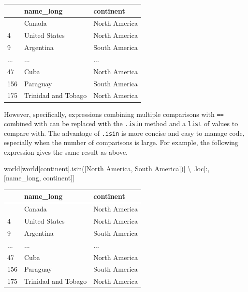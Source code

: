 \documentclass[
  letterpaper,
]{krantz}
\newenvironment{Shaded}{\begin{snugshade}}{\end{snugshade}}
\newcommand{\NormalTok}[1]{\textcolor[rgb]{0.00,0.23,0.31}{#1}}
\newcommand{\OperatorTok}[1]{\textcolor[rgb]{0.37,0.37,0.37}{#1}}
\newcommand{\StringTok}[1]{\textcolor[rgb]{0.13,0.47,0.30}{#1}}
\begin{document}
\begin{longtable}[]{@{}lll@{}}
\toprule\noalign{}
& name\_long & continent \\
\midrule\noalign{}
\endhead
\bottomrule\noalign{}
\endlastfoot
3 & Canada & North America \\
4 & United States & North America \\
9 & Argentina & South America \\
... & ... & ... \\
47 & Cuba & North America \\
156 & Paraguay & South America \\
175 & Trinidad and Tobago & North America \\
\end{longtable}

However, specifically, expressions combining multiple comparisons with
\texttt{==} combined with \texttt{\textbar{}} can be replaced with the
\texttt{.isin} method and a \texttt{list} of values to compare with. The
advantage of \texttt{.isin} is more concise and easy to manage code,
especially when the number of comparisons is large. For example, the
following expression gives the same result as above.

\begin{Shaded}
\begin{Highlighting}[]
\NormalTok{world[world[}\StringTok{\textquotesingle{}continent\textquotesingle{}}\NormalTok{].isin([}\StringTok{\textquotesingle{}North America\textquotesingle{}}\NormalTok{, }\StringTok{\textquotesingle{}South America\textquotesingle{}}\NormalTok{])]  }\OperatorTok{\textbackslash{}}
\NormalTok{    .loc[:, [}\StringTok{\textquotesingle{}name\_long\textquotesingle{}}\NormalTok{, }\StringTok{\textquotesingle{}continent\textquotesingle{}}\NormalTok{]]}
\end{Highlighting}
\end{Shaded}

\begin{longtable}[]{@{}lll@{}}
\toprule\noalign{}
& name\_long & continent \\
\midrule\noalign{}
\endhead
\bottomrule\noalign{}
\endlastfoot
3 & Canada & North America \\
4 & United States & North America \\
9 & Argentina & South America \\
... & ... & ... \\
47 & Cuba & North America \\
156 & Paraguay & South America \\
175 & Trinidad and Tobago & North America \\
\end{longtable}
\end{document}
